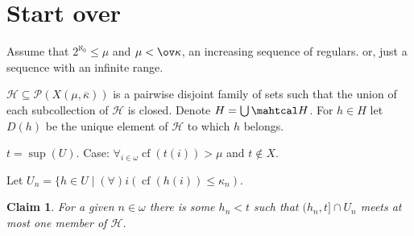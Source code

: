 \documentclass{amsart}
\newtheorem{claim}{Claim}[theorem]
\theoremstyle{remark}
\DeclareMathOperator{\cf}{cf}
\renewcommand\mid{\mathrel{|}\allowbreak}
\begin{document}
\section{Start over}

Assume that $2^{\aleph_0}\le \mu$ and $\mu<\ov\kappa$, an increasing sequence of regulars.
or, just a sequence with an infinite range. 

 $\mathcal H\subseteq \mathcal P(X(\mu,\overline \kappa))$ is a pairwise disjoint family of 
 sets such that the union of each subcollection of $\mathcal H$ is closed. 
 Denote
 $H=\bigcup \mahtcal H$. 
 For $h\in H$ let $D(h)$ be the unique element of $\mathcal H$ to which $h$ belongs. 

$t=\sup(U)$. Case: $\forall_{i\in \omega} \cf(t(i))>\mu$ and $t\notin X$. 

Let $U_n=\{h\in U\mid (\forall){i}(\cf(h(i))\le \kappa_n)$.

\begin{claim} For a given $n\in \omega$ there is some $h_n<t$ such that $(h_n,t]\cap U_n$ 
meets at most one member of $\mathcal H$. 
\end{claim}
\end{document}
